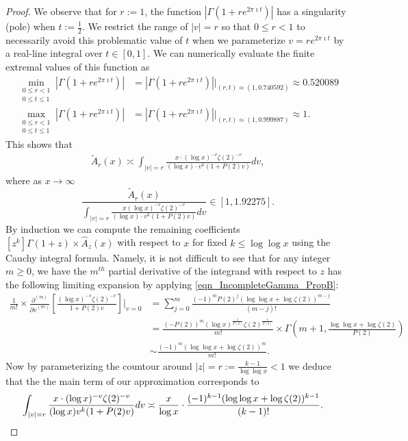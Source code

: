 \documentclass[11pt,reqno,a4letter]{article}
\numberwithin{figure}{section}
\numberwithin{table}{section}
\theoremstyle{plain}
\numberwithin{theorem}{section}
\theoremstyle{definition}
\begin{document}
\begin{proof}
We observe that for $r := 1$, the function $|\Gamma(1+re^{2\pi\imath t})|$ has a 
singularity (pole) when $t := \frac{1}{2}$. We restrict the range of $|v| = r$ 
so that $0 \leq r < 1$ to necessarily avoid this problematic value of $t$ when 
we parameterize $v = r e^{2\pi\imath t}$ by a real-line integral over $t \in [0, 1]$. 
We can numerically evaluate the finite extremal values of this function as 
\begin{align*} 
\min\limits_{\substack{0 \leq r < 1 \\ 0 \leq t \leq 1}} |\Gamma(1+re^{2\pi\imath t})| & = 
     |\Gamma(1+re^{2\pi\imath t})| \Biggr\rvert_{(r,t) \approx (1, 0.740592)} \approx 
     0.520089 \\ 
\max\limits_{\substack{0 \leq r < 1 \\ 0 \leq t \leq 1}} |\Gamma(1+re^{2\pi\imath t})| & = 
     |\Gamma(1+re^{2\pi\imath t})| \Biggr\rvert_{(r,t) \approx (1, 0.999887)} \approx 1. 
\end{align*} 
This shows that 
\begin{align} 
\label{eqn_WideTildeArx_CountourIntDef_v2} 
\widetilde{A}_r(x) \asymp 
     \int_{|v|=r} \frac{x \cdot (\log x)^{-v} \zeta(2)^{-v}}{(\log x) \cdot 
     v^{k} (1 + P(2) v)} dv, 
\end{align} 
where as $x \rightarrow \infty$ 
\[
\frac{\widetilde{A}_r(x)}{\int_{|v|=r} \frac{x (\log x)^{-v} \zeta(2)^{-v}}{(\log x) \cdot 
     v^{k} (1 + P(2) v)} dv} \in [1, 1.92275]. 
\] 
By induction we can compute the remaining coefficients 
$[z^k] \Gamma(1+z) \times \widehat{A}_z(x)$ with respect to 
$x$ for fixed $k \leq \log\log x$ using the Cauchy integral formula. 
Namely, it is not difficult to see that for any integer $m \geq 0$, 
we have the $m^{th}$ partial derivative of the integrand with respect to $z$ 
has the following limiting expansion by applying 
\eqref{eqn_IncompleteGamma_PropB}: 
\begin{align*} 
\frac{1}{m!} \times \frac{\partial^{(m)}}{{\partial v}^{(m)}}\left[ 
     \frac{(\log x)^{-v} \zeta(2)^{-v}}{1 + P(2) v}\right] \Biggr\rvert_{v=0} & = 
     \sum_{j=0}^{m} \frac{(-1)^{m} P(2)^{j} (\log\log x + \log\zeta(2))^{m-j}}{(m-j)!} \\ 
     & = 
     \frac{(-P(2))^{m} (\log x)^{\frac{1}{P(2)}} \zeta(2)^{\frac{1}{P(2)}}}{m!} \times 
     \Gamma\left(m+1, \frac{\log\log x + \log\zeta(2)}{P(2)}\right) \\ 
     & \sim \frac{(-1)^m (\log\log x + \log\zeta(2))^{m}}{m!}. 
\end{align*} 
Now by parameterizing the countour around $|z| = r := \frac{k-1}{\log\log x} < 1$ we 
deduce that the the main term of our approximation corresponds to 
\begin{align*} 
\int_{|v|=r} \frac{x \cdot (\log x)^{-v} \zeta(2)^{-v}}{(\log x) v^{k} (1 + P(2) v)} dv & \asymp 
     \frac{x}{\log x} \cdot \frac{(-1)^{k-1} (\log\log x + \log\zeta(2))^{k-1}}{(k-1)!}. 
     \qedhere 
\end{align*} 
\end{proof} 
\end{document}
